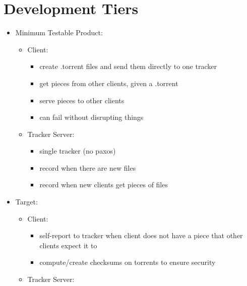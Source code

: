 \documentclass[11pt]{article}
\begin{document}
    \section*{Development Tiers}

        \begin{itemize}
            \item Minimum Testable Product:
                \begin{itemize}
                    \item Client:
                        \begin{itemize}
                            \item create .torrent files and send them directly to one tracker
                            \item get pieces from other clients, given a .torrent
                            \item serve pieces to other clients
                            \item can fail without disrupting things
                        \end{itemize}
                    \item Tracker Server:
                        \begin{itemize}
                            \item single tracker (no paxos)
                            \item record when there are new files
                            \item record when new clients get pieces of files
                        \end{itemize}
                \end{itemize}
            \item Target:
                \begin{itemize}
                    \item Client:
                        \begin{itemize}
                            \item self-report to tracker when client does not have a piece that other clients expect it to
                            \item compute/create checksums on torrents to ensure security
                        \end{itemize}
                    \item Tracker Server:
                        \begin{itemize}

\end{itemize}
\end{itemize}
\end{itemize}
\end{document}
